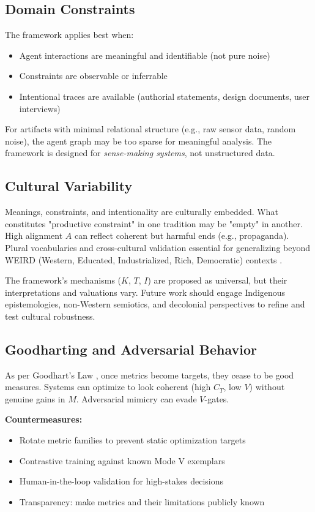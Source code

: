 \documentclass[12pt]{article}
\begin{document}
\subsection{Domain Constraints}

The framework applies best when:
\begin{itemize}
\item Agent interactions are meaningful and identifiable (not pure noise)
\item Constraints are observable or inferrable
\item Intentional traces are available (authorial statements, design documents, user interviews)
\end{itemize}

For artifacts with minimal relational structure (e.g., raw sensor data, random noise), the agent graph may be too sparse for meaningful analysis. The framework is designed for \textit{sense-making systems}, not unstructured data.

\subsection{Cultural Variability}

Meanings, constraints, and intentionality are culturally embedded. What constitutes "productive constraint" in one tradition may be "empty" in another. High alignment $A$ can reflect coherent but harmful ends (e.g., propaganda). Plural vocabularies and cross-cultural validation essential for generalizing beyond WEIRD (Western, Educated, Industrialized, Rich, Democratic) contexts \citep{henrich2010weirdest}.

The framework's mechanisms ($K$, $T$, $I$) are proposed as universal, but their interpretations and valuations vary. Future work should engage Indigenous epistemologies, non-Western semiotics, and decolonial perspectives to refine and test cultural robustness.

\subsection{Goodharting and Adversarial Behavior}

As per Goodhart's Law \citep{goodhart1984problems}, once metrics become targets, they cease to be good measures. Systems can optimize to look coherent (high $C_T$, low $V$) without genuine gains in $M$. Adversarial mimicry can evade $V$-gates.

\textbf{Countermeasures:}
\begin{itemize}
\item Rotate metric families to prevent static optimization targets
\item Contrastive training against known Mode V exemplars
\item Human-in-the-loop validation for high-stakes decisions
\item Transparency: make metrics and their limitations publicly known
\end{itemize}
\end{document}
